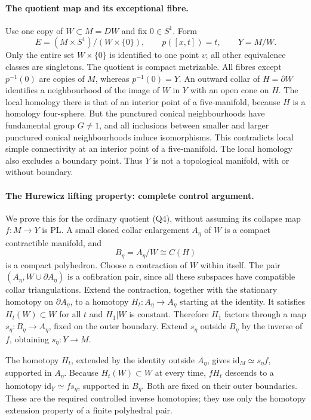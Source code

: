 \documentclass[11pt,a4paper]{article}
\theoremstyle{definition}
\begin{document}
\paragraph{The quotient map and its exceptional fibre.}
Use one copy of $W\subset M=DW$ and fix $0\in S^1$.  Form
\[
 E=(M\times S^1)/(W\times\{0\}),\qquad
 p([x,t])=t,
 \qquad Y=M/W.
 \tag{Q4}
\]
Only the entire set $W\times\{0\}$ is identified to one point $v$; all
other equivalence classes are singletons.  The quotient is compact
metrizable.  All fibres except $p^{-1}(0)$ are copies of $M$, whereas
$p^{-1}(0)=Y$.  An outward collar of $H=\partial W$ identifies a neighbourhood
of the image of $W$ in $Y$ with an open cone on $H$.
The local homology there is that of an interior point of a five-manifold,
because $H$ is a homology four-sphere.  But the punctured conical
neighbourhoods have fundamental group $G\ne1$, and all inclusions between
smaller and larger punctured conical neighbourhoods induce isomorphisms.
This contradicts local simple connectivity at an interior point of a
five-manifold.  The local homology also excludes a boundary point.  Thus
$Y$ is not a topological manifold, with or without boundary.

\paragraph{The Hurewicz lifting property: complete control argument.}
We prove this for the ordinary quotient (Q4), without assuming its
collapse map $f:M\to Y$ is PL.  A small closed collar enlargement $A_\eta$ of
$W$ is a compact contractible manifold, and
\[
 B_\eta=A_\eta/W\cong C(H)
\]
is a compact polyhedron.  Choose a contraction of $W$ within itself.
The pair $(A_\eta,W\cup\partial A_\eta)$ is a cofibration pair, since all
these subspaces have compatible collar triangulations.  Extend the
contraction, together with the stationary homotopy on $\partial A_\eta$,
to a homotopy $H_t:A_\eta\to A_\eta$ starting at the identity.  It satisfies
$H_t(W)\subset W$ for all $t$ and $H_1|W$ is constant.  Therefore $H_1$
factors through a map $s_\eta:B_\eta\to A_\eta$, fixed on the outer
boundary.  Extend $s_\eta$ outside $B_\eta$ by the inverse of $f$, obtaining
$s_\eta:Y\to M$.

The homotopy $H_t$, extended by the identity outside $A_\eta$, gives
$\mathrm{id}_M\simeq s_\eta f$, supported in $A_\eta$.  Because
$H_t(W)\subset W$ at every time, $fH_t$ descends to a homotopy
$\mathrm{id}_Y\simeq f s_\eta$, supported in $B_\eta$.  Both are fixed on
their outer boundaries.  These are the required controlled inverse
homotopies; they use only the homotopy extension property of a finite
polyhedral pair.
\end{document}
